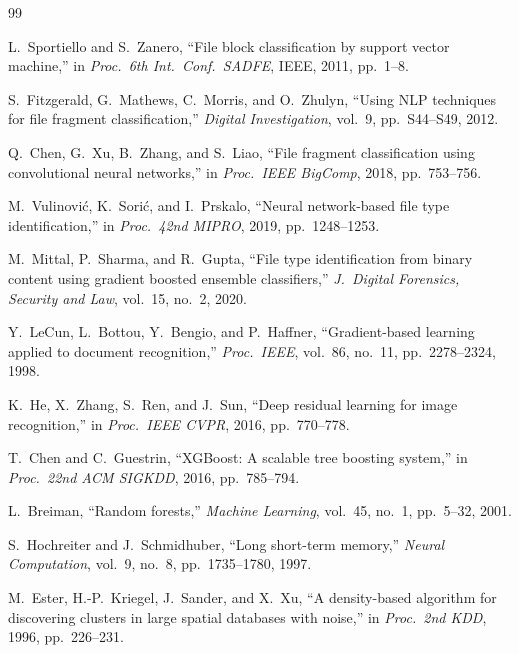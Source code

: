 \documentclass[12pt,a4paper]{report}
\begin{document}
\newpage
{}
\begin{normalsize}
{\setlength{\baselineskip}{0.9\baselineskip}
\begin{thebibliography}{99}

L.~Sportiello and S.~Zanero, ``File block classification by support vector machine,'' in \textit{Proc.~6th Int.~Conf.~SADFE}, IEEE, 2011, pp.~1--8.

S.~Fitzgerald, G.~Mathews, C.~Morris, and O.~Zhulyn, ``Using NLP techniques for file fragment classification,'' \textit{Digital Investigation}, vol.~9, pp.~S44--S49, 2012.

Q.~Chen, G.~Xu, B.~Zhang, and S.~Liao, ``File fragment classification using convolutional neural networks,'' in \textit{Proc.~IEEE BigComp}, 2018, pp.~753--756.

M.~Vulinovi\'{c}, K.~Sori\'{c}, and I.~Prskalo, ``Neural network-based file type identification,'' in \textit{Proc.~42nd MIPRO}, 2019, pp.~1248--1253.

M.~Mittal, P.~Sharma, and R.~Gupta, ``File type identification from binary content using gradient boosted ensemble classifiers,'' \textit{J.~Digital Forensics, Security and Law}, vol.~15, no.~2, 2020.

Y.~LeCun, L.~Bottou, Y.~Bengio, and P.~Haffner, ``Gradient-based learning applied to document recognition,'' \textit{Proc.~IEEE}, vol.~86, no.~11, pp.~2278--2324, 1998.

K.~He, X.~Zhang, S.~Ren, and J.~Sun, ``Deep residual learning for image recognition,'' in \textit{Proc.~IEEE CVPR}, 2016, pp.~770--778.

T.~Chen and C.~Guestrin, ``XGBoost: A scalable tree boosting system,'' in \textit{Proc.~22nd ACM SIGKDD}, 2016, pp.~785--794.

L.~Breiman, ``Random forests,'' \textit{Machine Learning}, vol.~45, no.~1, pp.~5--32, 2001.

S.~Hochreiter and J.~Schmidhuber, ``Long short-term memory,'' \textit{Neural Computation}, vol.~9, no.~8, pp.~1735--1780, 1997.

M.~Ester, H.-P.~Kriegel, J.~Sander, and X.~Xu, ``A density-based algorithm for discovering clusters in large spatial databases with noise,'' in \textit{Proc.~2nd KDD}, 1996, pp.~226--231.

\end{thebibliography}
\par}
\end{normalsize}
\end{document}

